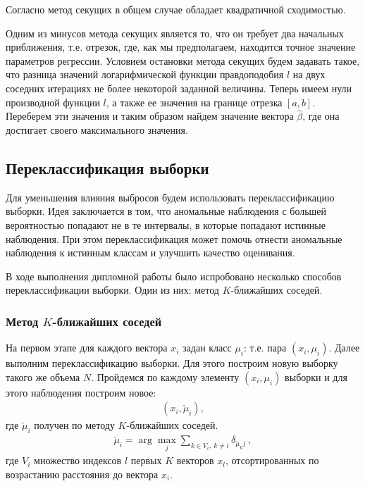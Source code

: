 Согласно \cite{NumericalMethods} метод секущих в общем случае обладает квадратичной сходимостью.

Одним из минусов метода секущих является то, что он требует два начальных приближения, т.е. отрезок, где, как мы предполагаем, находится точное значение параметров регрессии.
Условием остановки метода секущих будем задавать такое, что разница значений логарифмической функции правдоподобия $l$ на двух соседних итерациях не более некоторой заданной величины.
Теперь имеем нули производной функции $l$, а также ее значения на границе отрезка $[a,b]$.
Переберем эти значения и таким образом найдем значение вектора $\hat{\beta}$, где она достигает своего максимального значения.

\subsection{Переклассификация выборки}

Для уменьшения влияния выбросов будем использовать переклассификацию выборки.
Идея заключается в том, что аномальные наблюдения с большей вероятностью попадают не в те интервалы, в которые попадают истинные наблюдения. 
При этом переклассификация может помочь отнести аномальные наблюдения к истинным классам и улучшить качество оценивания.


В ходе выполнения дипломной работы было испробовано несколько способов переклассификации выборки. Один из них: метод $K$-ближайших соседей. 

\subsubsection{Метод $K$-ближайших соседей}
На первом этапе для каждого вектора $x_i$ задан класс $\mu_i$: т.е. пара $(x_i,\mu_i)$.
Далее выполним переклассификацию выборки. 
Для этого построим новую выборку такого же объема $N$.
Пройдемся по каждому элементу $(x_i, \mu_i)$ выборки и для этого наблюдения построим новое:
\begin{eqnarray}
    (x_i, \check{\mu}_i),
\end{eqnarray}
где $\check{\mu}_i$ получен по методу $K$-ближайших соседей\cite{NEAREST_NEIGHBOR}.\hfill\break
\begin{eqnarray}
    \check{\mu}_i = \arg\max_j \sum_{k \in V_i,~k\neq i} \delta_{\check{\mu}_k j}~,
\end{eqnarray}
где $V_i$ множество индексов $l$ первых $K$ векторов $x_l$, отсортированных по возрастанию расстояния до вектора $x_i$.

